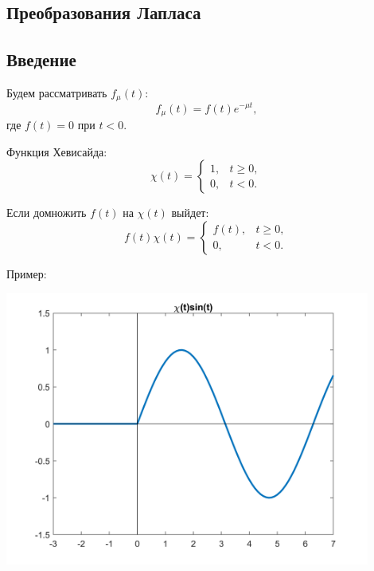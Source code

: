 \newpage

	\begin{center}
	\section{Преобразования Лапласа}
	\end{center}
	\subsection{Введение}
	\begin{minipage}{0.4\textwidth}
		Будем рассматривать $f_{\mu}(t):$
		$$
	  		f_{\mu}(t)=f(t)e^{-\mu t}, 
		 $$
		где $f(t) = 0 \text{ при }  t<0$. \newline
		
		Функция Хевисайда: 
		$$\chi (t) = 	\begin{cases}
							1, & t \geqslant 0,\\	
							0, & t < 0.
						\end{cases}$$	
		
		
		Если домножить $f(t)$ на $\chi(t)$ выйдет: 
		$$
		  f(t)\chi(t) =
		  	\begin{cases}
		  		f(t), & t \geqslant 0 ,\\
		  		0, & t<0.
		  	\end{cases} 
		$$
	\end{minipage}
	\hfill
	\begin{minipage}{0.6\textwidth}
		\centering Пример: 
		
		\includegraphics[width=0.9\textwidth]{ch10/pict/hev_pict.png}
	\end{minipage} \newline
	
